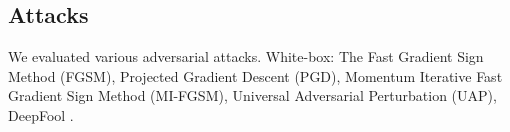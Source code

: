 \documentclass[conference]{IEEEtran}
\begin{document}
\subsection{Attacks}
We evaluated various adversarial attacks. White-box: The Fast Gradient Sign Method (FGSM), Projected Gradient Descent (PGD), Momentum Iterative Fast Gradient Sign Method (MI-FGSM), Universal Adversarial Perturbation (UAP), DeepFool \cite{goodfellow2015explaining,madry2018towardspgd,dong2018boosting,papernot2016limitations,moosavidezfooli2017universaladversarialperturbations,moosavidezfooli2016deepfoolsimpleaccuratemethod}.
\begin{table}[H]
\centering
\footnotesize
\caption{Overall Performance of U‑Net under Clean and Various Adversarial Attacks}
\label{tab:unet_combined_performance}
\end{table}
\end{document}
